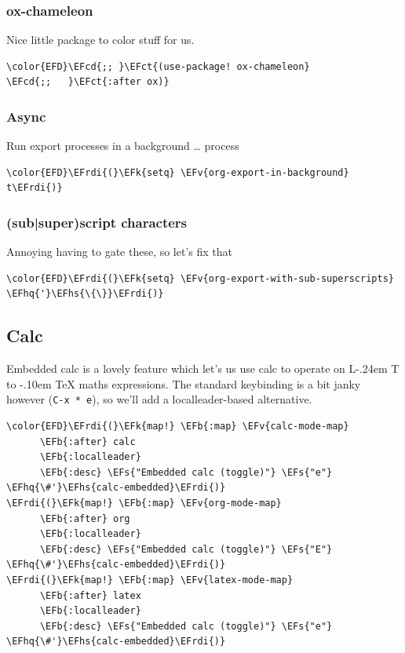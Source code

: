 \documentclass{scrartcl}
\makeatletter
\DeclareRobustCommand{\LaTeX}{L\kern-.24em%
        {\sbox\z@ T%
         \vbox to\ht\z@{\hbox{\check@mathfonts
                              \fontsize\sf@size\z@
                              \math@fontsfalse\selectfont
                              A}%
                        \vss}%
        }%
        \kern-.10em%
        \TeX}
\newcommand{\EFk}[1]{\textcolor{EFk}{#1}} %
\newcommand{\EFs}[1]{\textcolor{EFs}{#1}} %
\newcommand{\EFb}[1]{\textcolor{EFb}{#1}} %
\newcommand{\EFct}[1]{\textcolor{EFct}{#1}} %
\newcommand{\EFv}[1]{\textcolor{EFv}{#1}} %
\newcommand{\EFcd}[1]{\textcolor{EFcd}{#1}} %
\newcommand{\EFhq}[1]{#1} %
\newcommand{\EFhs}[1]{#1} %
\newcommand{\EFrdi}[1]{#1} %
\makeatother
\begin{document}
\subsubsection{ox-chameleon}
\label{sec:org2f477a3}
Nice little package to color stuff for us.
\begin{Code}
\begin{Verbatim}[]
\color{EFD}\EFcd{;; }\EFct{(use-package! ox-chameleon}
\EFcd{;;   }\EFct{:after ox)}
\end{Verbatim}
\end{Code}

\subsubsection{Async}
\label{sec:org43c6a67}
Run export processes in a background \ldots{} process
\begin{Code}
\begin{Verbatim}[]
\color{EFD}\EFrdi{(}\EFk{setq} \EFv{org-export-in-background} t\EFrdi{)}
\end{Verbatim}
\end{Code}

\subsubsection{(sub|super)script characters}
\label{sec:orge43e25b}
Annoying having to gate these, so let's fix that
\begin{Code}
\begin{Verbatim}[]
\color{EFD}\EFrdi{(}\EFk{setq} \EFv{org-export-with-sub-superscripts} \EFhq{'}\EFhs{\{\}}\EFrdi{)}
\end{Verbatim}
\end{Code}

\subsection{Calc}
\label{sec:orge9d1771}
Embedded calc is a lovely feature which let's us use calc to operate on \LaTeX{}
maths expressions. The standard keybinding is a bit janky however (\texttt{C-x * e}), so
we'll add a localleader-based alternative.

\begin{Code}
\begin{Verbatim}[]
\color{EFD}\EFrdi{(}\EFk{map!} \EFb{:map} \EFv{calc-mode-map}
      \EFb{:after} calc
      \EFb{:localleader}
      \EFb{:desc} \EFs{"Embedded calc (toggle)"} \EFs{"e"} \EFhq{\#'}\EFhs{calc-embedded}\EFrdi{)}
\EFrdi{(}\EFk{map!} \EFb{:map} \EFv{org-mode-map}
      \EFb{:after} org
      \EFb{:localleader}
      \EFb{:desc} \EFs{"Embedded calc (toggle)"} \EFs{"E"} \EFhq{\#'}\EFhs{calc-embedded}\EFrdi{)}
\EFrdi{(}\EFk{map!} \EFb{:map} \EFv{latex-mode-map}
      \EFb{:after} latex
      \EFb{:localleader}
      \EFb{:desc} \EFs{"Embedded calc (toggle)"} \EFs{"e"} \EFhq{\#'}\EFhs{calc-embedded}\EFrdi{)}
\end{Verbatim}
\end{Code}
\end{document}
